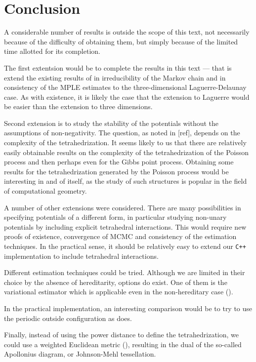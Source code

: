 \chapter*{Conclusion}

A considerable number of results is outside the scope of this text, not necessarily because of the difficulty of obtaining them, but simply because of the limited time allotted for its completion. 

The first extentsion would be to complete the results in this text --- that is extend the existing results of \cite{DereudreLavancier2009}  in irreducibility of the Markov chain and \cite{DereudreLavancier2011} in consistency of the MPLE estimates to the three-dimensional Laguerre-Delaunay case. As with existence, it is likely the case that the extension to Laguerre would be easier than the extension to three dimensions. 

Second extension is to study the stability of the potentials without the assumptions of non-negativity. The question, as noted in [ref], depends on the complexity of the tetrahedrization. It seems likely to us that there are relatively easily obtainable results on the complexity of the tetrahedrization of the Poisson process and then perhaps even for the Gibbs point process. Obtaining some results for the tetrahedrization generated by the Poisson process would be interesting in and of itself, as the study of such structures is popular in the field of computational geometry.

A number of other extensions were considered. There are many possibilities in specifying potentials of a different form, in particular studying non-unary potentials by including explicit tetrahedral interactions. This would require new proofs of existence, convergence of MCMC and consistency of the estimation techniques. In the practical sense, it should be relatively easy to extend our \texttt{C++} implementation to include tetrahedral interactions.

Different estimation techniques could be tried. Although we are limited in their choice by the absence of hereditarity, options do exist. One of them is the variational estimator which is applicable even in the non-hereditary case (\cite{BaddeleyDereudre2013}).

In the practical implementation, an interesting comparison would be to try to use the periodic outside configuration as \cite{DereudreLavancier2011} does.

Finally, instead of using the power distance to define the tetrahedrization, we could use a weighted Euclidean metric (\cite{Gavrilova}), resulting in the dual of the so-called Apollonius diagram, or Johnson-Mehl tessellation. 

